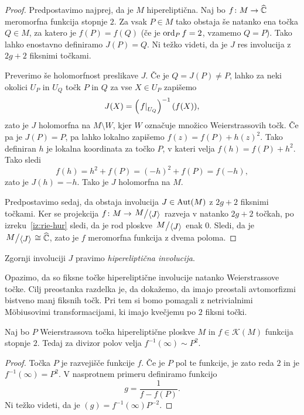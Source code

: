 \begin{proof}
Predpostavimo najprej, da je $M$ hipereliptična. Naj bo
$f \colon M \to \widehat{\mathbb{C}}$ meromorfna funkcija stopnje $2$. Za vsak
$P \in M$ tako obstaja še natanko ena točka $Q \in M$, za katero je
$f(P) = f(Q)$ (če je $\operatorname{ord}_P f = 2$, vzamemo $Q=P$). Tako lahko
enostavno definiramo $J(P) = Q$. Ni težko videti, da je $J$
res involucija z $2g + 2$ fiksnimi točkami.

Preverimo še holomorfnost preslikave $J$. Če je $Q = J(P) \ne P$,
lahko za neki okolici $U_P$ in $U_Q$ točk $P$ in $Q$ za vse
$X \in U_P$ zapišemo
\[
J(X) = \left(\left. f\right|_{U_Q}^{}\right)^{-1}(f(X)),
\]
zato je $J$ holomorfna na $M \setminus W$, kjer $W$ označuje
množico Weierstrassovih točk. Če pa je $J(P) = P$, pa lahko lokalno
zapišemo $f(z) = f(P) + h(z)^2$. Tako definiran $h$ je lokalna
koordinata za točko $P$, v kateri velja $f(h) = f(P) + h^2$. Tako
sledi
\[
f(h) = h^2 + f(P) = (-h)^2 + f(P) = f(-h),
\]
zato je $J(h) = -h$. Tako je $J$ holomorfna na $M$.

Predpostavimo sedaj, da obstaja involucija $J \in \operatorname{Aut}(M)$ z
$2g + 2$ fiksnimi točkami. Ker se projekcija
$f \colon M \to \kvoc{M}{\skl{J}}$ razveja v natanko $2g + 2$
točkah, po izreku~\ref{iz:rie-hur} sledi, da je rod ploskve
$\kvoc{M}{\skl{J}}$ enak $0$. Sledi, da je
$\kvoc{M}{\skl{J}} \cong \rs$, zato je $f$ meromorfna funkcija z
dvema poloma.
\end{proof}

Zgornji involuciji $J$ pravimo \emph{hipereliptična involucija}.

Opazimo, da so fiksne točke hipereliptične involucije natanko
Weierstrassove točke. Cilj preostanka razdelka je, da dokažemo, da
imajo preostali avtomorfizmi bistveno manj fiksnih točk. Pri tem si
bomo pomagali z netrivialnimi Möbiusovimi transformacijami, ki
imajo kvečjemu po $2$ fiksni točki.

\begin{lema}
Naj bo $P$ Weierstrassova točka hipereliptične ploskve $M$ in
$f \in \mathscr{K}(M)$ funkcija stopnje $2$. Tedaj za divizor polov
velja $f^{-1}(\infty) \sim P^2$.
\end{lema}

\begin{proof}
Točka $P$ je razvejišče funkcije $f$. Če je $P$ pol te funkcije, je
zato reda $2$ in je $f^{-1}(\infty) = P^2$. V nasprotnem primeru
definiramo funkcijo
\[
g = \frac{1}{f - f(P)}.
\]
Ni težko videti, da je $(g) = f^{-1}(\infty) P^{-2}$.
\end{proof}

